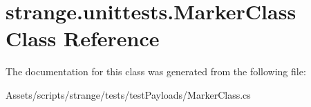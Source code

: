 \hypertarget{classstrange_1_1unittests_1_1_marker_class}{\section{strange.\-unittests.\-Marker\-Class Class Reference}
\label{classstrange_1_1unittests_1_1_marker_class}
}


The documentation for this class was generated from the following file\-:\begin{DoxyCompactItemize}
\item 
Assets/scripts/strange/tests/test\-Payloads/Marker\-Class.\-cs\end{DoxyCompactItemize}
